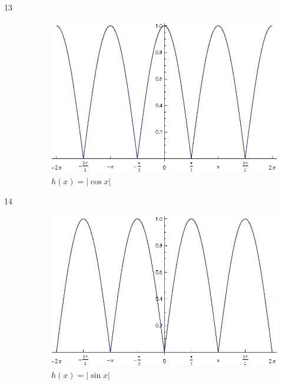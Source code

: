 \documentclass{exam}
\begin{document}
\begin{description}
      \item[13]
        \begin{figure}[H]
          \centering
          \includegraphics[scale=0.9]{exercise13.eps}
          \caption{$h(x) = | \cos x |$}
        \end{figure}

      \item[14]
        \begin{figure}[H]
          \centering
          \includegraphics[scale=0.9]{exercise14.eps}
          \caption{$h(x) = | \sin x |$}
        \end{figure}

      \pagebreak


\end{description}
\end{document}
